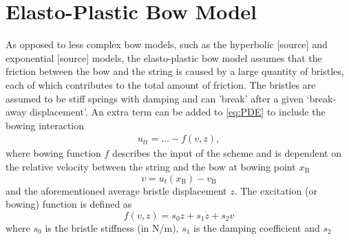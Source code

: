 \documentclass[twoside,a4paper]{article}
\begin{document}
\section{Elasto-Plastic Bow Model}
As opposed to less complex bow models, such as the hyperbolic [source] and exponential [source] models, the elasto-plastic bow model assumes that the friction between the bow and the string is caused by a large quantity of bristles, each of which contributes to the total amount of friction. The bristles are assumed to be stiff springs with damping and can 'break' after a given `break-away displacement'. An extra term can be added to \eqref{eq:PDE} to include the bowing interaction
\begin{equation}
    \begin{aligned}
    \label{eq:FDS}
        u_{tt} = \hdots - f(v, z),
    \end{aligned}
\end{equation}
where bowing function $f$ describes the input of the scheme and is dependent on the relative velocity between the string and the bow at bowing point $x_\text{B}$
\begin{equation}
  v = u_t(x_\text{B}) - v_\text{B}
\end{equation}
and the aforementioned average bristle displacement $z$. The excitation (or bowing) function is defined as
\begin{equation}
    f(v, z) = s_0z + s_1\dot z + s_2v
\end{equation}
where $s_0$ is the bristle stiffness (in N/m), $s_1$ is the damping coefficient and $s_2$ 
\end{document}
